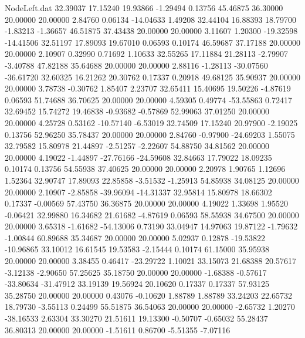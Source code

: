 \begin{filecontents}{NodeLeft.dat}
  32.39037   17.15240   19.93866    -1.29494    0.13756   45.46875   36.30000   20.00000   20.00000    2.84760    0.06134  -14.04633    1.49208
  32.44104   16.88393   18.79700    -1.83213   -1.36657   46.51875   37.43438   20.00000   20.00000    3.11607    1.20300  -19.32598  -14.41506
  32.51197   17.89093   19.67010     0.06593    0.10174   46.59687   37.17188   20.00000   20.00000    2.10907    0.32990    0.71692    1.10633
  32.55265   17.11884   21.28113    -2.79907   -3.40788   47.82188   35.64688   20.00000   20.00000    2.88116   -1.28113  -30.07560  -36.61720
  32.60325   16.21262   20.30762     0.17337    0.20918   49.68125   35.90937   20.00000   20.00000    3.78738   -0.30762    1.85407    2.23707
  32.65411   15.40695   19.50226    -4.87619    0.06593   51.74688   36.70625   20.00000   20.00000    4.59305    0.49774  -53.55863    0.72417
  32.69452   15.74272   19.46838    -0.93682   -0.57869   52.99063   37.01250   20.00000   20.00000    4.25728    0.53162  -10.57140   -6.53019
  32.74509   17.15240   20.97900    -2.19025    0.13756   52.96250   35.78437   20.00000   20.00000    2.84760   -0.97900  -24.69203    1.55075
  32.79582   15.80978   21.44897    -2.51257   -2.22607   54.88750   34.81562   20.00000   20.00000    4.19022   -1.44897  -27.76166  -24.59608
  32.84663   17.79022   18.09235     0.10174    0.13756   54.55938   37.40625   20.00000   20.00000    2.20978    1.90765    1.12696    1.52364
  32.90747   17.89093   22.85858    -3.51532   -1.25913   54.85938   34.08125   20.00000   20.00000    2.10907   -2.85858  -39.96094  -14.31337
  32.95814   15.80978   18.66302     0.17337   -0.00569   57.43750   36.36875   20.00000   20.00000    4.19022    1.33698    1.95520   -0.06421
  32.99880   16.34682   21.61682    -4.87619    0.06593   58.55938   34.67500   20.00000   20.00000    3.65318   -1.61682  -54.13006    0.73190
  33.04947   14.97063   19.87122    -1.79632   -1.00844   60.89688   35.34687   20.00000   20.00000    5.02937    0.12878  -19.53822  -10.96865
  33.10012   16.61545   19.53583    -2.15444    0.10174   61.15000   35.95938   20.00000   20.00000    3.38455    0.46417  -23.29722    1.10021
  33.15073   21.68388   20.57617    -3.12138   -2.90650   57.25625   35.18750   20.00000   20.00000   -1.68388   -0.57617  -33.80634  -31.47912
  33.19139   19.56924   20.10620     0.17337    0.17337   57.93125   35.28750   20.00000   20.00000    0.43076   -0.10620    1.88789    1.88789
  33.24203   22.65732   18.79730    -3.55113    0.24499   55.51875   36.54063   20.00000   20.00000   -2.65732    1.20270  -38.16533    2.63304
  33.30270   21.51611   19.13300    -0.50707   -0.65032   55.28437   36.80313   20.00000   20.00000   -1.51611    0.86700   -5.51355   -7.07116

\end{filecontents}

